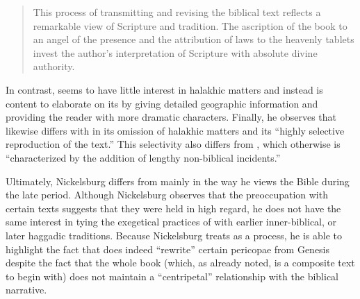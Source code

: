 \begin{quote}
    This process of transmitting and revising the biblical text reflects a remarkable view of Scripture and tradition. The \psgraphic ascription of the book to an angel of the presence and the attribution of laws to the heavenly tablets invest the author's interpretation of Scripture with absolute divine authority.%
    \autocite[101]{nickelsburg_stone1984}
\end{quote} 

In contrast, \ga seems to have little interest in halakhic matters and instead is content to elaborate on its \vorlagen by giving detailed geographic information and providing the reader with more dramatic characters.%
    \autocite[106]{nickelsburg_stone1984}
Finally, he observes that \lab likewise differs with \jub in its omission of halakhic matters and its ``highly selective reproduction of the text.''%
    \autocite[110]{nickelsburg_stone1984}
This selectivity also differs from \ga, which otherwise is ``characterized by the addition of lengthy non-biblical incidents.''%
    \autocite[110]{nickelsburg_stone1984} 

Ultimately, Nickelsburg differs from \vermes mainly in the way he views the Bible during the late \secondtemple period. Although Nickelsburg observes that the preoccupation with certain texts suggests that they were held in high regard, he does not have the same interest in tying the exegetical practices of \rwb with earlier inner-biblical, or later haggadic traditions. Because Nickelsburg treats \rwb as a process, he is able to highlight the fact that \firstenoch does indeed ``rewrite'' certain pericopae from Genesis despite the fact that the whole book (which, as already noted, is a composite text to begin with) does not maintain a ``centripetal'' relationship with the biblical narrative. 


